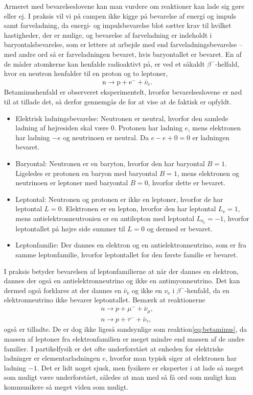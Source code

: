 Armeret med bevarelseslovene kan man vurdere om reaktioner kan lade sig gøre eller ej. I praksis vil vi på campen ikke kigge på bevarelse af energi og impuls samt farveladning, da energi- og impulsbevarelse blot sætter krav til hvilket hastigheder, der er mulige, og bevarelse af farveladning er indeholdt i baryontalsbevarelse, som er lettere at arbejde med end farveladningsbevarelse -- med andre ord så er farveladningen bevaret, hvis baryontallet er bevaret. En af de måder atomkerne kan henfalde radioaktivt på, er ved et såkaldt $\beta^-$-helfald, hvor en neutron henfalder til en proton og to leptoner,
%
\begin{align} \label{eq:betaminus}
    \mathrm n \rightarrow \mathrm p + \mathrm{e}^- + \bar{\nu}_\mathrm{e}.
\end{align}
%
Betaminushenfald er observeret eksperimentelt, hvorfor bevarelseslovene er nød til at tillade det, så derfor gennemgås de for at vise at de faktisk er opfyldt.
%
\begin{itemize}
    \item Elektrisk ladningsbevarelse: Neutronen er neutral, hvorfor den samlede ladning af højresiden skal være 0. Protonen har ladning $e$, mens elektronen har ladning $-e$ og neutrinoen er neutral. Da $e-e+0=0$ er ladningen bevaret.
    \item Baryontal: Neutronen er en baryton, hvorfor den har baryontal $B=1$. Ligeledes er protonen en baryon med baryontal $B=1$, mens elektronen og neutrinoen er leptoner med baryontal $B=0$, hvorfor dette er bevaret.
    \item Leptontal: Neutronen og protonen er ikke en leptoner, hvorfor de har leptontal $L=0$. Elektronen er en lepton, hvorfor den har leptontal $L_\text{e} = 1$, mens antielektronneutronien er en antilepton med leptontal $L_{\bar{\nu}_\mathrm{e}} = -1$, hvorfor leptontallet på højre side summer til $L=0$ og dermed er bevaret.
    \item Leptonfamilie: Der dannes en elektron og en antielektronneutrino, som er fra samme leptonfamilie, hvorfor leptontallet for den første familie er bevaret.
\end{itemize}
%
I praksis betyder bevarelsen af leptonfamilierne at når der dannes en elektron, dannes der også en antielektronneutrino og ikke en antimyonneutrino. Det kan dermed også forklares at der dannes en $\bar{\nu}_\mathrm{e}$ og ikke en $\nu_\mathrm{e}$ i $\beta^-$-henfald, da en elektronneutrino ikke bevarer leptontallet. Bemærk at reaktionerne
%
\begin{align}
    n \rightarrow p + \mu^- + \bar{\nu}_\mu, \\
    n \rightarrow p + \tau^- + \bar{\nu}_\tau,
\end{align}
%
også er tilladte. De er dog ikke ligeså sandsynlige som reaktion\eqref{eq:betaminus}, da massen af leptoner fra elektronfamilien er meget mindre end massen af de andre familier. I partikelfysik er det ofte underforstået at enheden for elektriske ladninger er elementarladningen $e$, hvorfor man typisk siger at elektronen har ladning $-1$. Det er lidt noget sjusk, men fysikere er eksperter i at lade så meget som muligt være underforstået, således at man med så få ord som muligt kan kommunikere så meget viden som muligt.

